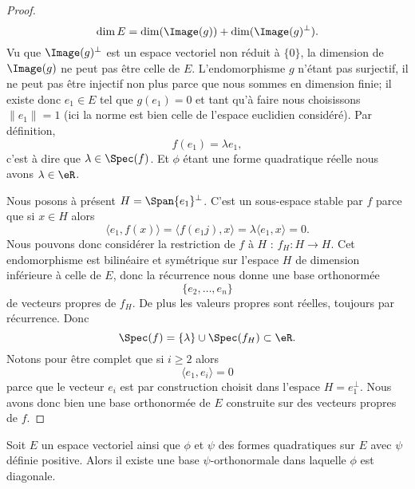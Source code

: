 \begin{proof}
    \begin{equation}
        \dim E=\dim(\Image(g))+\dim( \Image(g)^{\perp}).
    \end{equation}
    Vu que \( \Image(g)^{\perp}\) est un espace vectoriel non réduit à \( \{ 0 \}\), la dimension de \( \Image(g)\) ne peut pas être celle de \( E\). L'endomorphisme \( g\) n'étant pas surjectif, il ne peut pas être injectif non plus parce que nous sommes en dimension finie; il existe donc \( e_1\in E\) tel que \( g(e_1)=0\) et tant qu'à faire nous choisissons \( \| e_1 \|=1\) (ici la norme est bien celle de l'espace euclidien considéré). Par définition,
    \begin{equation}
        f(e_1)=\lambda e_1,
    \end{equation}
    c'est à dire que \( \lambda\in\Spec(f)\). Et \( \phi\) étant une forme quadratique réelle nous avons \( \lambda\in \eR\).

    Nous posons à présent \( H=\Span\{ e_1 \}^{\perp}\). C'est un sous-espace stable par \( f\) parce que si \( x\in H\) alors
    \begin{equation}
        \langle e_1, f(x)\rangle =\langle f(e_1j),x\rangle =\lambda\langle e_1, x\rangle =0.
    \end{equation}
    Nous pouvons donc considérer la restriction de \( f\) à \( H\) : \( f_H\colon H\to H\). Cet endomorphisme est bilinéaire et symétrique sur l'espace \( H\) de dimension inférieure à celle de \( E\), donc la récurrence nous donne une base orthonormée
    \begin{equation}
        \{ e_2,\ldots, e_n \}
    \end{equation}
    de vecteurs propres de \( f_H\). De plus les valeurs propres sont réelles, toujours par récurrence. Donc
    \begin{equation}
        \Spec(f)=\{ \lambda \}\cup\Spec(f_H)\subset \eR.
    \end{equation}
    Notons pour être complet que si \( i\geq 2\) alors
    \begin{equation}
        \langle e_1, e_i\rangle =0
    \end{equation}
    parce que le vecteur \( e_i\) est par construction choisit dans l'espace \( H=e_1^{\perp}\). Nous avons donc bien une base orthonormée de \( E\) construite sur des vecteurs propres de \( f\).
\end{proof}

\begin{corollary}   \label{CorSMHpoVK}
    Soit \( E\) un espace vectoriel ainsi que \( \phi\) et \( \psi\) des formes quadratiques sur \( E\) avec \( \psi\) définie positive. Alors il existe une base \( \psi\)-orthonormale dans laquelle \( \phi\) est diagonale.
\end{corollary}

